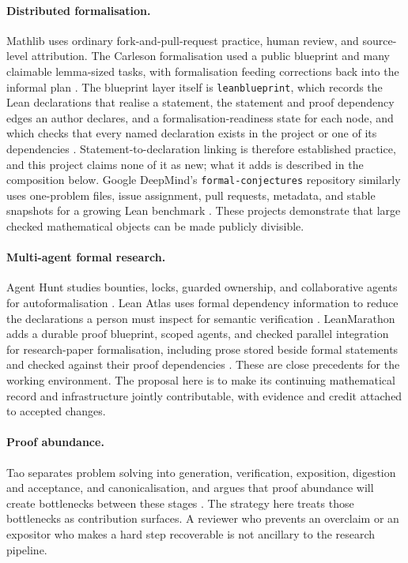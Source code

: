 \documentclass[10pt]{article}
\begin{document}
\paragraph{Distributed formalisation.}
Mathlib uses ordinary fork-and-pull-request practice, human review, and
source-level attribution.  The Carleson formalisation used a public blueprint
and many claimable lemma-sized tasks, with formalisation feeding corrections
back into the informal plan \cite{mathlib,carleson}.  The blueprint layer
itself is \texttt{leanblueprint}, which records the Lean declarations that
realise a statement, the statement and proof dependency edges an author
declares, and a formalisation-readiness state for each node, and which checks
that every named declaration exists in the project or one of its dependencies
\cite{leanblueprint}.  Statement-to-declaration linking is therefore
established practice, and this project claims none of it as new; what it adds
is described in the composition below.  Google DeepMind's
\texttt{formal-conjectures} repository similarly uses one-problem files,
issue assignment, pull requests, metadata, and stable snapshots for a growing
Lean benchmark \cite{formalconjectures}.  These projects demonstrate that
large checked mathematical objects can be made publicly divisible.

\paragraph{Multi-agent formal research.}
Agent Hunt studies bounties, locks, guarded ownership, and collaborative
agents for autoformalisation \cite{agenthunt}.  Lean Atlas uses formal
dependency information to reduce the declarations a person must inspect for
semantic verification \cite{leanatlas}.  LeanMarathon adds a durable proof blueprint, scoped agents, and checked
parallel integration for research-paper formalisation, including prose stored
beside formal statements and checked against their proof dependencies
\cite{leanmarathon}.
These are close precedents for the working environment. The proposal here is
to make its continuing mathematical record and infrastructure jointly
contributable, with evidence and credit attached to accepted changes.

\paragraph{Proof abundance.}
Tao separates problem solving into generation, verification, exposition,
digestion and acceptance, and canonicalisation, and argues that proof
abundance will create bottlenecks between these stages \cite{tao2026}.  The
strategy here treats those bottlenecks as contribution surfaces.  A reviewer
who prevents an overclaim or an expositor who makes a hard step recoverable is
not ancillary to the research pipeline.
\end{document}
